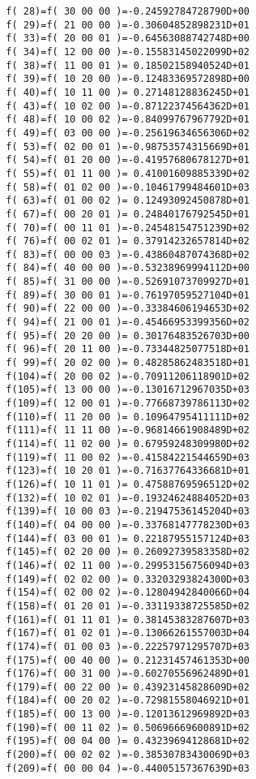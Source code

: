 {\begin{verbatim}
  f( 28)=f( 30 00 00 )=-0.24592784728790D+00
  f( 29)=f( 21 00 00 )=-0.30604852898231D+01
  f( 33)=f( 20 00 01 )=-0.64563088742748D+00
  f( 34)=f( 12 00 00 )=-0.15583145022099D+02
  f( 38)=f( 11 00 01 )= 0.18502158940524D+01
  f( 39)=f( 10 20 00 )=-0.12483369572898D+00
  f( 40)=f( 10 11 00 )= 0.27148128836245D+01
  f( 43)=f( 10 02 00 )=-0.87122374564362D+01
  f( 48)=f( 10 00 02 )=-0.84099767967792D+01
  f( 49)=f( 03 00 00 )=-0.25619634656306D+02
  f( 53)=f( 02 00 01 )=-0.98753574315669D+01
  f( 54)=f( 01 20 00 )=-0.41957680678127D+01
  f( 55)=f( 01 11 00 )= 0.41001609885339D+02
  f( 58)=f( 01 02 00 )=-0.10461799484601D+03
  f( 63)=f( 01 00 02 )= 0.12493092450878D+01
  f( 67)=f( 00 20 01 )= 0.24840176792545D+01
  f( 70)=f( 00 11 01 )=-0.24548154751239D+02
  f( 76)=f( 00 02 01 )= 0.37914232657814D+02
  f( 83)=f( 00 00 03 )=-0.43860487074368D+02
  f( 84)=f( 40 00 00 )=-0.53238969994112D+00
  f( 85)=f( 31 00 00 )=-0.52691073709927D+01
  f( 89)=f( 30 00 01 )=-0.76197059527104D+01
  f( 90)=f( 22 00 00 )=-0.33384606194653D+02
  f( 94)=f( 21 00 01 )=-0.45466953399356D+02
  f( 95)=f( 20 20 00 )= 0.30176483526703D+00
  f( 96)=f( 20 11 00 )=-0.73344825077518D+01
  f( 99)=f( 20 02 00 )= 0.48285862483518D+01
  f(104)=f( 20 00 02 )=-0.70911206118901D+02
  f(105)=f( 13 00 00 )=-0.13016712967035D+03
  f(109)=f( 12 00 01 )=-0.77668739786113D+02
  f(110)=f( 11 20 00 )= 0.10964795411111D+02
  f(111)=f( 11 11 00 )=-0.96814661908489D+02
  f(114)=f( 11 02 00 )= 0.67959248309980D+02
  f(119)=f( 11 00 02 )=-0.41584221544659D+03
  f(123)=f( 10 20 01 )=-0.71637764336681D+01
  f(126)=f( 10 11 01 )= 0.47588769596512D+02
  f(132)=f( 10 02 01 )=-0.19324624884052D+03
  f(139)=f( 10 00 03 )=-0.21947536145204D+03
  f(140)=f( 04 00 00 )=-0.33768147778230D+03
  f(144)=f( 03 00 01 )= 0.22187955157124D+03
  f(145)=f( 02 20 00 )= 0.26092739583358D+02
  f(146)=f( 02 11 00 )=-0.29953156756094D+03
  f(149)=f( 02 02 00 )= 0.33203293824300D+03
  f(154)=f( 02 00 02 )=-0.12804942840066D+04
  f(158)=f( 01 20 01 )=-0.33119338725585D+02
  f(161)=f( 01 11 01 )= 0.38145383287607D+03
  f(167)=f( 01 02 01 )=-0.13066261557003D+04
  f(174)=f( 01 00 03 )=-0.22257971295707D+03
  f(175)=f( 00 40 00 )= 0.21231457461353D+00
  f(176)=f( 00 31 00 )=-0.60270556962489D+01
  f(179)=f( 00 22 00 )= 0.43923145828609D+02
  f(184)=f( 00 20 02 )=-0.72981558046921D+01
  f(185)=f( 00 13 00 )=-0.12013612969892D+03
  f(190)=f( 00 11 02 )= 0.50696669600891D+02
  f(195)=f( 00 04 00 )= 0.43239694128681D+02
  f(200)=f( 00 02 02 )=-0.38530783430069D+03
  f(209)=f( 00 00 04 )=-0.44005157367639D+03
\end{verbatim}}


